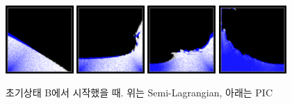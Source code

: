 \documentclass[12pt, A4]{article}
\begin{document}
\begin{figure}[h!]
\includegraphics[width=0.23\textwidth]{pic-state-b/img1}
\includegraphics[width=0.23\textwidth]{pic-state-b/img2}
\includegraphics[width=0.23\textwidth]{pic-state-b/img3}
\includegraphics[width=0.23\textwidth]{pic-state-b/img4}
  \caption{초기상태 B에서 시작했을 때. 위는 Semi-Lagrangian, 아래는 PIC}
  \label{fluid-b}
\end{figure}

\clearpage
\end{document}
